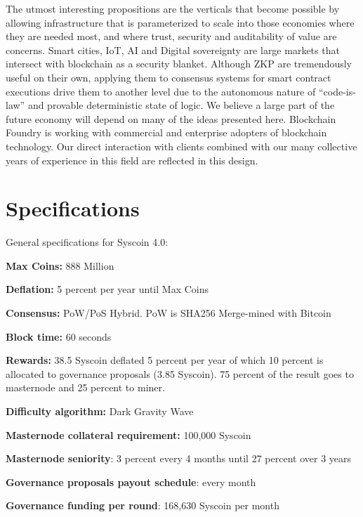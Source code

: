\documentclass[peerreview]{ieeesyscoin}
\begin{document}
The utmost interesting propositions are the verticals that become possible by allowing infrastructure that is parameterized to scale into those economies where they are needed most, and where trust, security and auditability of value are concerns. Smart cities, IoT, AI and Digital sovereignty are large markets that intersect with blockchain as a security blanket. Although ZKP are tremendously useful on their own, applying them to consensus systems for smart contract executions drive them to another level due to the autonomous nature of “code-is-law” and provable deterministic state of logic. We believe a large part of the future economy will depend on many of the ideas presented here. Blockchain Foundry is working with commercial and enterprise adopters of blockchain technology. Our direct interaction with clients combined with our many collective years of experience in this field are reflected in this design.


\section{Specifications}
\label{section:specs}

General specifications for Syscoin 4.0:

\begin{description}[font=$\bullet$~\normalfont\scshape\color{blue!50!black}]
\item \textbf{Max Coins:} 888 Million
\item \textbf{Deflation:}  5 percent per year until Max Coins
\item \textbf{Consensus:} PoW/PoS Hybrid. PoW is SHA256
Merge-mined with Bitcoin
\item \textbf{Block time:} 60 seconds 
\item \textbf{Rewards:} 38.5 Syscoin deflated 5 percent per year
of which 10 percent is allocated to governance proposals (3.85 Syscoin). 75 percent of the result goes
to masternode and 25 percent to miner.
\item \textbf{Difficulty algorithm:} Dark Gravity Wave
\item \textbf{Masternode collateral requirement:} 100,000 Syscoin
\item \textbf{Masternode seniority}: 3 percent every 4 months until
27 percent over 3 years
\item \textbf{Governance proposals payout schedule}: every month
\item \textbf{Governance funding per round}: 168,630 Syscoin per
month
\end{description}
\end{document}
